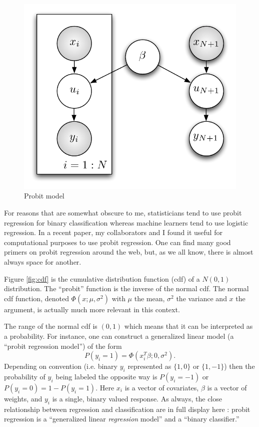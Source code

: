 \documentclass[11pt]{amsart}
\begin{document}
\begin{figure}[htbp]
\begin{center}
\includegraphics{probit}
\caption{Probit model}
\label{fig:probit}
\end{center}
\end{figure}




For reasons that are somewhat obscure to me, statisticians tend to use probit regression for binary classification whereas machine learners tend to use logistic regression.  In a recent paper, my collaborators and I found it useful for computational purposes to use probit regression.  One can find many good primers on probit regression around the web, but, as we all know, there is almost always space for another.  

Figure \ref{fig:cdf} is the cumulative distribution function (cdf) of a $N(0,1)$ distribution.  The ``probit'' function is the inverse of the normal cdf.    The normal cdf function, denoted $\Phi(x;\mu,\sigma^2)$ with $\mu$ the mean, $\sigma^2$ the variance and $x$ the argument, is actually much more relevant in this context.

The range of the normal cdf is $(0,1)$ which means that it can be interpreted as a probability.  For instance, one can construct a generalized linear model (a ``probit regression model'') of the form 
\begin{equation}
P(y_i = 1) = \Phi(x_i^T\beta; 0, \sigma^2). \label{eqn:probit}
\end{equation}  Depending on convention (i.e. binary $y_i$ represented as $\{1,0\}$ or $\{1,-1\}$) then the probability of $y_i$ being labeled the opposite way is $P(y_i = -1)$ or $P(y_i = 0) = 1 - P(y_i=1).$  Here $x_i$ is a vector of covariates, $\beta$ is a vector of weights, and $y_i$ is a single, binary valued response.  As always, the close relationship between regression and classification are in full display here : probit regression is a ``generalized linear {\em regression} model'' and a ``binary classifier.''
\end{document}
